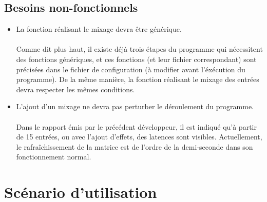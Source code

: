 \documentclass{article}
\begin{document}
\subsection{Besoins non-fonctionnels}
\begin{itemize}
 \item La fonction réalisant le mixage devra être générique.
       \paragraph{}
       Comme dit plus haut, il existe déjà trois étapes du programme qui
       nécessitent des fonctions génériques, et ces fonctions (et leur fichier
       correspondant) sont précisées dans le fichier de configuration (à
       modifier avant l'éxécution du programme). De la même manière, la
       fonction réalisant le mixage des entrées devra respecter les mêmes
       conditions.
 \item L'ajout d'un mixage ne devra pas perturber le déroulement du programme.
       \paragraph{}
       Dans le rapport émis par le précédent développeur, il est indiqué qu'à
       partir de 15 entrées, ou avec l'ajout d'effets, des latences sont
       visibles. Actuellement, le rafraîchissement de la matrice est de l'ordre
       de la demi-seconde dans son fonctionnement normal.
\end{itemize}
\section{Scénario d'utilisation}
\end{document}
